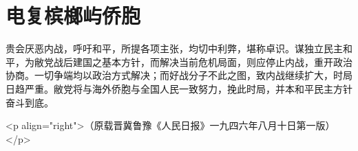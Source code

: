 \section[电复槟榔屿侨胞（一九四六年八月七日）]{电复槟榔屿侨胞}


贵会厌恶内战，呼吁和平，所提各项主张，均切中利弊，堪称卓识。谋独立民主和平，为敝党战后建国之基本方针，而解决当前危机局面，则应停止内战，重开政治协商。一切争端均以政治方式解决；而好战分子不此之图，致内战继续扩大，时局日趋严重。敝党将与海外侨胞与全国人民一致努力，挽此时局，并本和平民主方针奋斗到底。

<p align="right">（原载晋冀鲁豫《人民日报》一九四六年八月十日第一版）</p>

